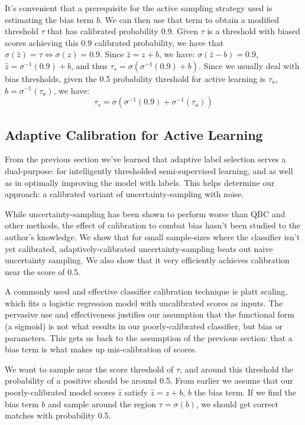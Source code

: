 \documentclass{article}
\begin{document}
It's convenient that a prerequisite for the active sampling strategy used is estimating the bias term $b$.  We can then use that term to obtain a modified threshold $\tau$ that has calibrated probability 0.9.  Given $\tau$ is a threshold with biased scores achieving this 0.9 calibrated probability, we have that $\sigma(\hat{z})=\tau \iff \sigma(z)=0.9$.  Since $\hat{z}=z+b$, we have:
$\sigma(\hat{z}-b)=0.9$, $\hat{z}=\sigma^{-1}(0.9)+b$, and thus $\tau_s=\sigma(\sigma^{-1}(0.9)+b)$.  Since we usually deal with bias thresholds, given the 0.5 probability threshold for active learning is $\tau_a$, $b=\sigma^{-1}(\tau_a)$, we have:
$$\tau_s=\sigma(\sigma^{-1}(0.9)+\sigma^{-1}(\tau_a))$$

\subsection{Adaptive Calibration for Active Learning}
From the previous section we've learned that adaptive label selection serves a dual-purpose: for intelligently thresholded semi-supervised learning, and as well as in optimally improving the model with labels.  This helps determine our approach: a calibrated variant of uncertainty-sampling with noise. 

While uncertainty-sampling has been shown to perform worse than QBC and other methods, the effect of calibration to combat bias hasn't been studied to the author's knowledge.  We show that for small sample-sizes where the classifier isn't yet calibrated, adaptively-calibrated uncertainty-sampling beats out naive uncertainty sampling.  We also show that it very efficiently achieves calibration near the score of 0.5. 

A commonly used and effective classifier calibration technique is platt scaling, which fits a logistic regression model with uncalibrated scores as inputs.  The pervasive use and effectiveness justifies our assumption that the functional form (a sigmoid) is not what results in our poorly-calibrated classifier, but bias or parameters.  This gets us back to the assumption of the previous section: that a bias term is what makes up mis-calibration of scores.  

We want to sample near the score threshold of $\tau$, and around this threshold the probability of a positive should be around 0.5.  From earlier we assume that our poorly-calibrated model scores $\hat{z}$ satisfy $\hat{z} = z+b$, $b$ the bias term.  If we find the bias term $b$ and sample around the region $\tau = \sigma(b)$, we should get correct matches with probability 0.5.  
\end{document}
